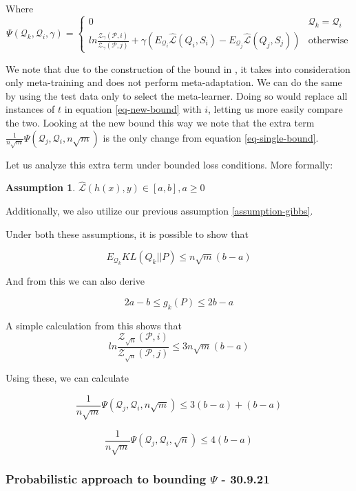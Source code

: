 \documentclass[letterpaper]{article}
\theoremstyle{definition}
\newtheorem{assumption}{Assumption}
\begin{document}
Where \begin{equation*}
 \Psi(\mathcal{Q}_k,\mathcal{Q}_i,\gamma)=\begin{cases}
0 &\mathcal{Q}_k=\mathcal{Q}_i\\
ln\frac{\mathcal{Z}_{\gamma}(\mathcal{P}, i)}{\mathcal{Z}_{\gamma}(\mathcal{P}, j)} 
+\gamma \left (E_{\mathcal{Q}_i} \hat{\mathcal{L}}(Q_i,S_i)
	-E_{\mathcal{Q}_j} \hat{\mathcal{L}}(Q_j,S_j)\right )  &\text{otherwise}
\end{cases}
\end{equation*}

We note that due to the construction of the bound in \cite{Rothfuss2020}, it takes into consideration only meta-training and does not perform meta-adaptation. We can do the same by using the test data only to select the meta-learner. Doing so would replace all instances of $t$ in equation \ref{eq-new-bound} with $i$, letting us more easily compare the two. Looking at the new bound this way we note that the extra term $\frac{1}{n\sqrt{m}}\Psi(\mathcal{Q}_j, \mathcal{Q}_i, n\sqrt{m})$ is the only change from equation \ref{eq-single-bound}.

Let us analyze this extra term under bounded loss conditions. More formally:

\begin{assumption} \label{assumption-bounded-loss}
	 $\hat{\mathcal{L}}(h(x), y)\in [a, b], a\geq0$
\end{assumption}

Additionally, we also utilize our previous assumption \ref{assumption-gibbs}.

Under both these assumptions, it is possible to show that 

$$E_{\mathcal{Q}_k} KL(Q_k||P)\leq n\sqrt{m} (b-a)$$

And from this we can also derive

$$2a-b\leq g_k(P) \leq 2b-a$$

A simple calculation from this shows that $$ln\frac{\mathcal{Z}_{\sqrt{n}}(\mathcal{P}, i)}{\mathcal{Z}_{\sqrt{n}}(\mathcal{P}, j)} \leq 3n\sqrt{m}(b-a)$$

Using these, we can calculate

$$\frac{1}{n\sqrt{m}}\Psi(\mathcal{Q}_j, \mathcal{Q}_i, n\sqrt{m})\leq 3(b-a)  + (b-a)$$ 

$$\frac{1}{n\sqrt{m}}\Psi(\mathcal{Q}_j, \mathcal{Q}_i, \sqrt{n})\leq 4(b-a)$$ 


\subsubsection{Probabilistic approach to bounding $\Psi$ - 30.9.21}
\end{document}

